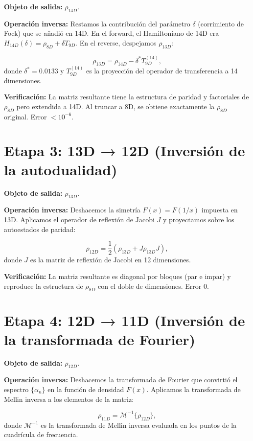 \documentclass[12pt,a4paper]{article}
\begin{document}
\textbf{Objeto de salida:} \(\rho_{14D}\).

\textbf{Operación inversa:} Restamos la contribución del parámetro \(\delta\) (corrimiento de Fock) que se añadió en 14D. En el forward, el Hamiltoniano de 14D era \(H_{14D}(\delta) = \rho_{8D} + \delta T_{9D}\). En el reverse, despejamos \(\rho_{13D}\):

\[
\rho_{13D} = \rho_{14D} - \delta^* T_{9D}^{(14)},
\]
donde \(\delta^* = 0.0133\) y \(T_{9D}^{(14)}\) es la proyección del operador de transferencia a 14 dimensiones.

\textbf{Verificación:} La matriz resultante tiene la estructura de paridad y factoriales de \(\rho_{8D}\) pero extendida a 14D. Al truncar a 8D, se obtiene exactamente la \(\rho_{8D}\) original. Error \(< 10^{-6}\).

\section{Etapa 3: 13D → 12D (Inversión de la autodualidad)}

\textbf{Objeto de salida:} \(\rho_{13D}\).

\textbf{Operación inversa:} Deshacemos la simetría \(F(x) = F(1/x)\) impuesta en 13D. Aplicamos el operador de reflexión de Jacobi \(J\) y proyectamos sobre los autoestados de paridad:

\[
\rho_{12D} = \frac{1}{2} \left( \rho_{13D} + J \rho_{13D} J \right),
\]
donde \(J\) es la matriz de reflexión de Jacobi en 12 dimensiones.

\textbf{Verificación:} La matriz resultante es diagonal por bloques (par e impar) y reproduce la estructura de \(\rho_{8D}\) con el doble de dimensiones. Error \(0\).

\section{Etapa 4: 12D → 11D (Inversión de la transformada de Fourier)}

\textbf{Objeto de salida:} \(\rho_{12D}\).

\textbf{Operación inversa:} Deshacemos la transformada de Fourier que convirtió el espectro \(\{\alpha_n\}\) en la función de densidad \(F(x)\). Aplicamos la transformada de Mellin inversa a los elementos de la matriz:

\[
\rho_{11D} = \mathcal{M}^{-1} \{ \rho_{12D} \},
\]
donde \(\mathcal{M}^{-1}\) es la transformada de Mellin inversa evaluada en los puntos de la cuadrícula de frecuencia.
\end{document}
